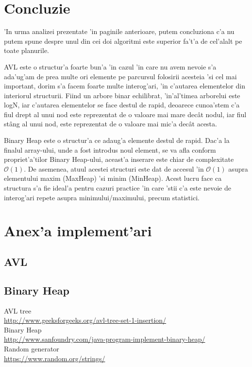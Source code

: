 \documentclass[titlepage,12pt]{article}
\numberwithin{figure}{section}
\begin{document}
\section{Concluzie}
\par 'In urma analizei prezentate 'in paginile anterioare, putem concluziona c'a nu putem spune despre unul din cei doi algoritmi este superior fa't'a de cel'alalt pe toate planurile.
\par AVL este o structur'a foarte bun'a 'in cazul 'in care nu avem nevoie s'a ada'ug'am de prea multe ori elemente pe parcursul folosirii acesteia 'si cel mai important, dorim s'a facem foarte multe interog'ari, 'in c'autarea elementelor din interiorul structurii. Fiind un arbore binar echilibrat, 'in'al'timea arborelui este logN, iar c'autarea elementelor se face destul de rapid, deoarece cunoa'stem c'a fiul drept al unui nod este reprezentat de o valoare mai mare dec\^at nodul, iar fiul st\^ang al unui nod, este reprezentat de o valoare mai mic'a dec\^at acesta.
\par Binary Heap este o structur'a ce adaug'a elemente destul de rapid. Dac'a la finalul array-ului, unde a fost introdus noul element, se va afla conform propriet'a'tilor Binary Heap-ului, aceast'a inserare este chiar de complexitate $\mathcal{O}(1)$. De asemenea, atuul acestei structuri este dat de accesul 'in $\mathcal{O}(1)$ asupra elementului maxim (MaxHeap) 'si minim (MinHeap). Acest lucru face ca structura s'a fie ideal'a pentru cazuri practice 'in care 'stii c'a este nevoie de interog'ari repete asupra minimului/maximului, precum statistici.





\newpage
\section{Anex'a implement'ari}
\subsection{AVL}

\subsection{Binary Heap}



\newpage
\begin{thebibliography}{2}
AVL tree
\\
\href {http://www.geeksforgeeks.org/avl-tree-set-1-insertion/}{http://www.geeksforgeeks.org/avl-tree-set-1-insertion/}  
\\
Binary Heap
\\
\href {http://www.sanfoundry.com/java-program-implement-binary-heap/}{http://www.sanfoundry.com/java-program-implement-binary-heap/} 
\\
Random generator
\\
\href {https://www.random.org/strings/}{https://www.random.org/strings/} 
\\
\end{thebibliography}
\end{document}

